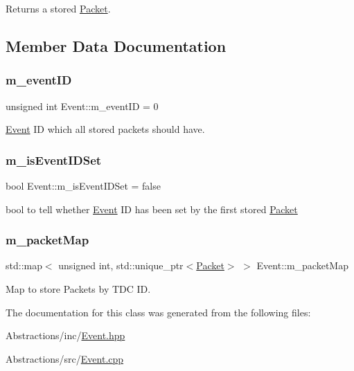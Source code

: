 Returns a stored \hyperlink{class_packet}{Packet}. 



\subsection{Member Data Documentation}
\mbox{\label{class_event_af0c352ab6a128f9df56b231d941aff25}} 
\subsubsection{\texorpdfstring{m\+\_\+event\+ID}{m\_eventID}}
{\footnotesize\ttfamily unsigned int Event\+::m\+\_\+event\+ID = 0\hspace{0.3cm}{\ttfamily [private]}}



\hyperlink{class_event}{Event} ID which all stored packets should have. 

\mbox{\label{class_event_a3b435b2fe840647c01ae0ee838b66a54}} 
\subsubsection{\texorpdfstring{m\+\_\+is\+Event\+I\+D\+Set}{m\_isEventIDSet}}
{\footnotesize\ttfamily bool Event\+::m\+\_\+is\+Event\+I\+D\+Set = false\hspace{0.3cm}{\ttfamily [private]}}



bool to tell whether \hyperlink{class_event}{Event} ID has been set by the first stored \hyperlink{class_packet}{Packet} 

\mbox{\label{class_event_a6aabddb7af6189a884d8eacd582bc10f}} 
\subsubsection{\texorpdfstring{m\+\_\+packet\+Map}{m\_packetMap}}
{\footnotesize\ttfamily std\+::map$<$ unsigned int, std\+::unique\+\_\+ptr$<$\hyperlink{class_packet}{Packet}$>$ $>$ Event\+::m\+\_\+packet\+Map\hspace{0.3cm}{\ttfamily [private]}}



Map to store Packets by T\+DC ID. 



The documentation for this class was generated from the following files\+:\begin{DoxyCompactItemize}
\item 
Abstractions/inc/\hyperlink{_event_8hpp}{Event.\+hpp}\item 
Abstractions/src/\hyperlink{_event_8cpp}{Event.\+cpp}\end{DoxyCompactItemize}
